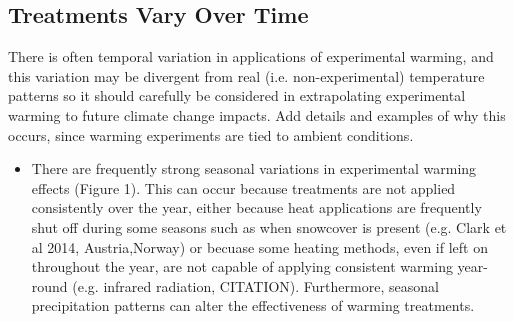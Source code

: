 \documentclass{article}
\begin{document}
\subsection {Treatments Vary Over Time}
There is often temporal variation in applications of experimental warming, and this variation may be divergent from real (i.e. non-experimental) temperature patterns so it should carefully be considered in extrapolating experimental warming to future climate change impacts. Add details and examples of why this occurs, since warming experiments are tied to ambient conditions. 
\begin{itemize}
\item There are frequently strong seasonal variations in experimental warming effects (Figure 1). This can occur because treatments are not applied consistently over the year, either because heat applications are frequently shut off during some seasons such as when snowcover is present (e.g. Clark et al 2014, Austria,Norway) or becuase some heating methods, even if left on throughout the year, are not capable of applying consistent warming year-round (e.g. infrared radiation, CITATION). Furthermore, seasonal precipitation patterns can alter the effectiveness of warming treatments. %


\end{itemize}
\end{document}
